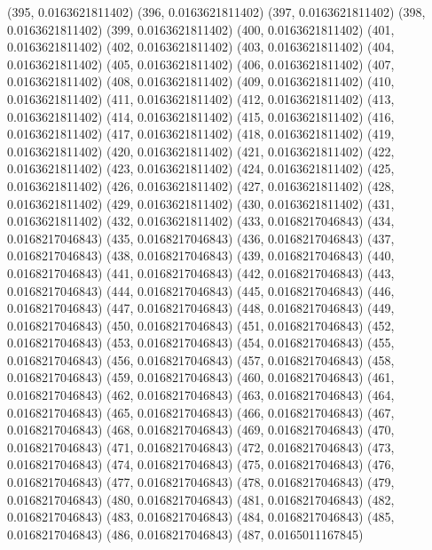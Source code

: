 {					(395, 0.0163621811402)
					(396, 0.0163621811402)
					(397, 0.0163621811402)
					(398, 0.0163621811402)
					(399, 0.0163621811402)
					(400, 0.0163621811402)
					(401, 0.0163621811402)
					(402, 0.0163621811402)
					(403, 0.0163621811402)
					(404, 0.0163621811402)
					(405, 0.0163621811402)
					(406, 0.0163621811402)
					(407, 0.0163621811402)
					(408, 0.0163621811402)
					(409, 0.0163621811402)
					(410, 0.0163621811402)
					(411, 0.0163621811402)
					(412, 0.0163621811402)
					(413, 0.0163621811402)
					(414, 0.0163621811402)
					(415, 0.0163621811402)
					(416, 0.0163621811402)
					(417, 0.0163621811402)
					(418, 0.0163621811402)
					(419, 0.0163621811402)
					(420, 0.0163621811402)
					(421, 0.0163621811402)
					(422, 0.0163621811402)
					(423, 0.0163621811402)
					(424, 0.0163621811402)
					(425, 0.0163621811402)
					(426, 0.0163621811402)
					(427, 0.0163621811402)
					(428, 0.0163621811402)
					(429, 0.0163621811402)
					(430, 0.0163621811402)
					(431, 0.0163621811402)
					(432, 0.0163621811402)
					(433, 0.0168217046843)
					(434, 0.0168217046843)
					(435, 0.0168217046843)
					(436, 0.0168217046843)
					(437, 0.0168217046843)
					(438, 0.0168217046843)
					(439, 0.0168217046843)
					(440, 0.0168217046843)
					(441, 0.0168217046843)
					(442, 0.0168217046843)
					(443, 0.0168217046843)
					(444, 0.0168217046843)
					(445, 0.0168217046843)
					(446, 0.0168217046843)
					(447, 0.0168217046843)
					(448, 0.0168217046843)
					(449, 0.0168217046843)
					(450, 0.0168217046843)
					(451, 0.0168217046843)
					(452, 0.0168217046843)
					(453, 0.0168217046843)
					(454, 0.0168217046843)
					(455, 0.0168217046843)
					(456, 0.0168217046843)
					(457, 0.0168217046843)
					(458, 0.0168217046843)
					(459, 0.0168217046843)
					(460, 0.0168217046843)
					(461, 0.0168217046843)
					(462, 0.0168217046843)
					(463, 0.0168217046843)
					(464, 0.0168217046843)
					(465, 0.0168217046843)
					(466, 0.0168217046843)
					(467, 0.0168217046843)
					(468, 0.0168217046843)
					(469, 0.0168217046843)
					(470, 0.0168217046843)
					(471, 0.0168217046843)
					(472, 0.0168217046843)
					(473, 0.0168217046843)
					(474, 0.0168217046843)
					(475, 0.0168217046843)
					(476, 0.0168217046843)
					(477, 0.0168217046843)
					(478, 0.0168217046843)
					(479, 0.0168217046843)
					(480, 0.0168217046843)
					(481, 0.0168217046843)
					(482, 0.0168217046843)
					(483, 0.0168217046843)
					(484, 0.0168217046843)
					(485, 0.0168217046843)
					(486, 0.0168217046843)
					(487, 0.0165011167845)
}
